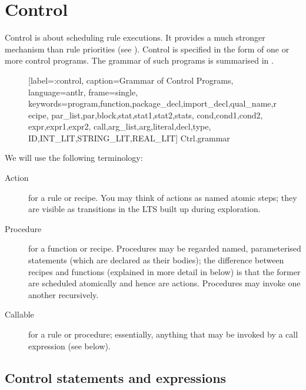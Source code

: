 \clearpage
\section{Control}

Control is about scheduling rule executions. It provides a much stronger
mechanism than rule priorities (see ).  Control is
specified in the form of one or more control programs. The grammar of such
programs is summarised in .

\lstset{
	basicstyle=\ttfamily\scriptsize
}

\begin{figure}

  [label=\lstprf:control,%
   caption={Grammar of Control Programs},%
   language=antlr,
   frame=single,
   keywords={program,function,package_decl,import_decl,qual_name,recipe,%
             par_list,par,block,stat,stat1,stat2,stats,
             cond,cond1,cond2,
             expr,expr1,expr2,
             call,arg_list,arg,literal,decl,type,
             ID,INT_LIT,STRING_LIT,REAL_LIT}]%
  {Ctrl.grammar}
\end{figure}

\medskip\noindent We will use the following terminology:
%
\begin{description}
\item[Action] for a rule or recipe. You may think of actions as named atomic steps; they are visible as transitions in the LTS built up during exploration.

\item[Procedure] for a function or recipe. Procedures may be regarded named, parameterised statements (which are declared as their bodies); the difference between recipes and functions (explained in more detail in  below) is that the former are scheduled atomically and hence are actions. Procedures may invoke one another recursively.

\item[Callable] for a rule or procedure; essentially, anything that may be invoked by a call expression (see below).
\end{description}

\subsection{Control statements and expressions}

